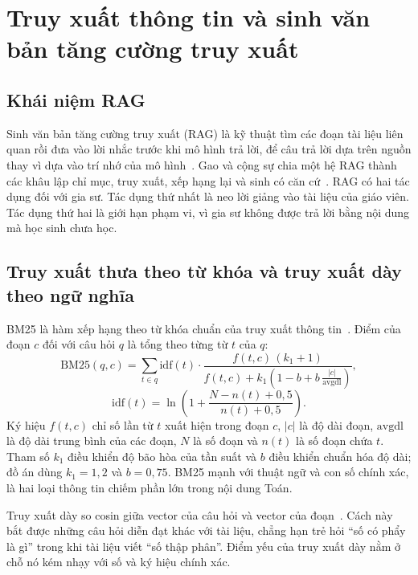 \section{Truy xuất thông tin và sinh văn bản tăng cường truy xuất}

\subsection{Khái niệm RAG}
Sinh văn bản tăng cường truy xuất (RAG) là kỹ thuật tìm các đoạn tài liệu liên quan rồi đưa vào lời nhắc trước khi mô hình trả lời, để câu trả lời dựa trên nguồn thay vì dựa vào trí nhớ của mô hình~\cite{lewis2020}. Gao và cộng sự chia một hệ RAG thành các khâu lập chỉ mục, truy xuất, xếp hạng lại và sinh có căn cứ~\cite{gao2023survey}. RAG có hai tác dụng đối với gia sư. Tác dụng thứ nhất là neo lời giảng vào tài liệu của giáo viên. Tác dụng thứ hai là giới hạn phạm vi, vì gia sư không được trả lời bằng nội dung mà học sinh chưa học.

\subsection{Truy xuất thưa theo từ khóa và truy xuất dày theo ngữ nghĩa}
BM25 là hàm xếp hạng theo từ khóa chuẩn của truy xuất thông tin~\cite{robertson2009}. Điểm của đoạn $c$ đối với câu hỏi $q$ là tổng theo từng từ $t$ của $q$:
\begin{equation}
\mathrm{BM25}(q,c)=\sum_{t\in q}\mathrm{idf}(t)\cdot\frac{f(t,c)\,(k_1+1)}{f(t,c)+k_1\left(1-b+b\,\frac{|c|}{\mathrm{avgdl}}\right)},
\label{eq:bm25}
\end{equation}
\begin{equation}
\mathrm{idf}(t)=\ln\!\left(1+\frac{N-n(t)+0{,}5}{n(t)+0{,}5}\right).
\end{equation}
Ký hiệu $f(t,c)$ chỉ số lần từ $t$ xuất hiện trong đoạn $c$, $|c|$ là độ dài đoạn, $\mathrm{avgdl}$ là độ dài trung bình của các đoạn, $N$ là số đoạn và $n(t)$ là số đoạn chứa $t$. Tham số $k_1$ điều khiển độ bão hòa của tần suất và $b$ điều khiển chuẩn hóa độ dài; đồ án dùng $k_1=1{,}2$ và $b=0{,}75$. BM25 mạnh với thuật ngữ và con số chính xác, là hai loại thông tin chiếm phần lớn trong nội dung Toán.

Truy xuất dày so cosin giữa vector của câu hỏi và vector của đoạn~\cite{karpukhin2020}. Cách này bắt được những câu hỏi diễn đạt khác với tài liệu, chẳng hạn trẻ hỏi ``số có phẩy là gì'' trong khi tài liệu viết ``số thập phân''. Điểm yếu của truy xuất dày nằm ở chỗ nó kém nhạy với số và ký hiệu chính xác.

